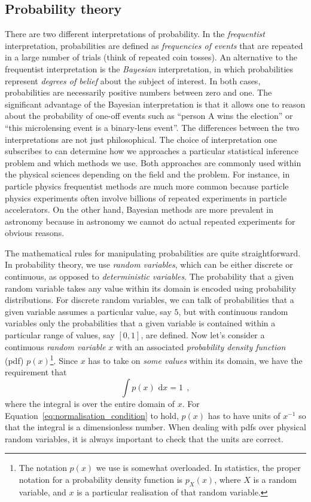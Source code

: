 \documentclass[12pt,dvipsnames]{report}
\newcommand{\ud}{\,\mathrm{d}}
\newcommand{\hquad}{~~}
\begin{document}
\subsection{Probability theory}
There are two different interpretations of probability. In the
\emph{frequentist} interpretation, probabilities are defined as \emph{frequencies of
    events} that are repeated in a large number of trials (think of  repeated
coin tosses). An alternative to the frequentist interpretation is the
\emph{Bayesian} interpretation, in which probabilities represent \emph{degrees
    of belief} about the subject of interest. In both cases, probabilities are
necessarily positive numbers between zero and one. The significant advantage of the
Bayesian interpretation is that it allows one to reason about the probability
of one-off events such as ``person A wins the election'' or ``this microlensing
event is a binary-lens event''. The differences between the two interpretations
are not just philosophical. The choice of interpretation one subscribes to can
determine how we approaches a particular statistical inference problem and
which methods we use. Both approaches are commonly used within the
physical sciences depending on the field and the problem. For instance,
in particle physics frequentist methods are much more common because
particle physics experiments often involve billions of repeated experiments in
particle accelerators. On the other hand, Bayesian methods are more prevalent in
astronomy because in astronomy we cannot do actual repeated experiments for obvious reasons.

The mathematical rules for manipulating probabilities are quite
straightforward. In probability theory, we use \emph{random variables}, which can
be either discrete or continuous, as opposed to \emph{deterministic variables}. 
The probability  that a given random variable takes any value within its domain is encoded 
using probability distributions.
For discrete random variables, we can talk of probabilities that a given
variable assumes a particular value, say $5$, but with continuous random
variables only the probabilities that a given variable is contained within
a particular range of values, say $[0,1]$, are defined. 
Now let's consider a continuous
\emph{random variable} $x$ with an associated \emph{probability density function}
(pdf) $p(x)$\footnote{The notation $p(x)$ we use is somewhat overloaded. In
    statistics, the proper notation for a probability density function is
    $p_{X}(x)$, where $X$ is a random variable, and $x$ is a particular realisation
    of that random variable.}. Since $x$ has to take on \emph{some values} within
its domain, we have the requirement that
\begin{equation}
    \int p(x)\,\ud x=1
    \hquad,
    \label{eq:normalisation_condition}
\end{equation}
where the integral is over the entire domain of $x$.
For Equation~\ref{eq:normalisation_condition} to hold,
$p(x)$ has to have units of $x^{-1}$ so that
the integral is a dimensionless number. When dealing with pdfs over physical random 
variables, it is always important to check that the units are correct.
\end{document}

